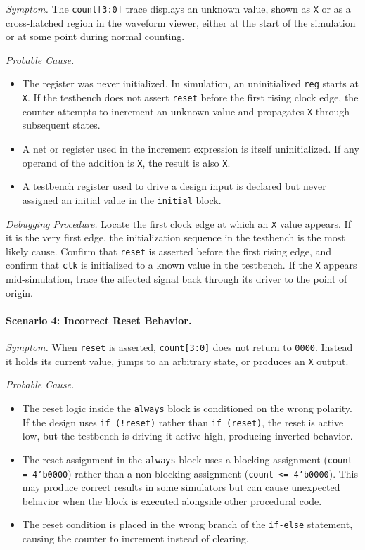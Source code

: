 \textit{Symptom.} The \texttt{count[3:0]} trace displays an unknown value,
shown as \texttt{X} or as a cross-hatched region in the waveform viewer,
either at the start of the simulation or at some point during normal counting.

\textit{Probable Cause.}
\begin{itemize}
    \item The register was never initialized. In simulation, an uninitialized
          \texttt{reg} starts at \texttt{X}. If the testbench does not assert
          \texttt{reset} before the first rising clock edge, the counter
          attempts to increment an unknown value and propagates \texttt{X}
          through subsequent states.
    \item A net or register used in the increment expression is itself
          uninitialized. If any operand of the addition is \texttt{X}, the
          result is also \texttt{X}.
    \item A testbench register used to drive a design input is declared
          but never assigned an initial value in the \texttt{initial} block.
\end{itemize}

\textit{Debugging Procedure.} Locate the first clock edge at which an
\texttt{X} value appears. If it is the very first edge, the initialization
sequence in the testbench is the most likely cause. Confirm that
\texttt{reset} is asserted before the first rising edge, and confirm that
\texttt{clk} is initialized to a known value in the testbench. If the
\texttt{X} appears mid-simulation, trace the affected signal back through
its driver to the point of origin.

\paragraph{Scenario 4: Incorrect Reset Behavior.}

\textit{Symptom.} When \texttt{reset} is asserted, \texttt{count[3:0]}
does not return to \texttt{0000}. Instead it holds its current value,
jumps to an arbitrary state, or produces an \texttt{X} output.

\textit{Probable Cause.}
\begin{itemize}
    \item The reset logic inside the \texttt{always} block is conditioned on
          the wrong polarity. If the design uses \texttt{if (!reset)} rather
          than \texttt{if (reset)}, the reset is active low, but the testbench
          is driving it active high, producing inverted behavior.
    \item The reset assignment in the \texttt{always} block uses a blocking
          assignment (\texttt{count = 4'b0000}) rather than a non-blocking
          assignment (\texttt{count <= 4'b0000}). This may produce correct
          results in some simulators but can cause unexpected behavior when
          the block is executed alongside other procedural code.
    \item The reset condition is placed in the wrong branch of the
          \texttt{if-else} statement, causing the counter to increment instead
          of clearing.
\end{itemize}

